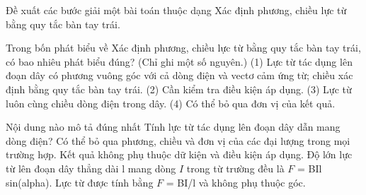 \begin{bt}
Đề xuất các bước giải một bài toán thuộc dạng Xác định phương, chiều lực từ bằng quy tắc bàn tay trái.
\end{bt}

\begin{ex}
Trong bốn phát biểu về Xác định phương, chiều lực từ bằng quy tắc bàn tay trái, có bao nhiêu phát biểu đúng? (Chỉ ghi một số nguyên.) (1) Lực từ tác dụng lên đoạn dây có phương vuông góc với cả dòng điện và vectơ cảm ứng từ; chiều xác định bằng quy tắc bàn tay trái. (2) Cần kiểm tra điều kiện áp dụng. (3) Lực từ luôn cùng chiều dòng điện trong dây. (4) Có thể bỏ qua đơn vị của kết quả.
\end{ex}

\begin{ex}
Nội dung nào mô tả đúng nhất Tính lực từ tác dụng lên đoạn dây dẫn mang dòng điện?
\choice
{Có thể bỏ qua phương, chiều và đơn vị của các đại lượng trong mọi trường hợp.}
{Kết quả không phụ thuộc dữ kiện và điều kiện áp dụng.}
{\True Độ lớn lực từ lên đoạn dây thẳng dài l mang dòng $I$ trong từ trường đều là $F$ = BIl sin(alpha).}
{Lực từ được tính bằng $F$ = BI/l và không phụ thuộc góc.}
\end{ex}

